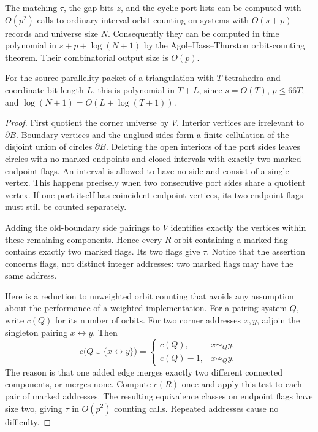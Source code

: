 \begin{theorem}
\label{thm:marked-boundary}
The matching $\tau$, the gap bits $z$, and the cyclic port lists can be
computed with $O(p^2)$ calls to ordinary interval-orbit counting on systems
with $O(s+p)$ records and universe size $N$.  Consequently they can be
computed in time polynomial in $s+p+\log(N+1)$ by the Agol--Hass--Thurston
orbit-counting theorem.  Their combinatorial output size is $O(p)$.

For the source parallelity packet of a triangulation with $T$ tetrahedra
and coordinate bit length $L$, this is polynomial in $T+L$, since
$s=O(T)$, $p\leq66T$, and $\log(N+1)=O(L+\log(T+1))$.
\end{theorem}
\begin{proof}
First quotient the corner universe by $V$.  Interior vertices are
irrelevant to $\partial B$.  Boundary vertices and the unglued sides form
a finite cellulation of the disjoint union of circles $\partial B$.
Deleting the open interiors of the port sides leaves circles with no
marked endpoints and closed intervals with exactly two marked endpoint
flags.  An interval is allowed to have no side and consist of a single
vertex.  This happens precisely when two consecutive port sides share
a quotient vertex.  If one port itself has coincident endpoint vertices,
its two endpoint flags must still be counted separately.

Adding the old-boundary side pairings to $V$ identifies exactly the
vertices within these remaining components.  Hence every $R$-orbit
containing a marked flag contains exactly two marked flags.  Its two flags
give $\tau$.  Notice that the assertion concerns flags, not distinct
integer addresses: two marked flags may have the same address.

Here is a reduction to unweighted orbit counting that avoids any assumption
about the performance of a weighted implementation.  For a pairing system
$Q$, write $c(Q)$ for its number of orbits.  For two corner addresses $x,y$,
adjoin the singleton pairing $x\leftrightarrow y$.  Then
\[
 c\bigl(Q\cup\{x\leftrightarrow y\}\bigr)
 =\begin{cases}
 c(Q),&x\sim_Q y,\\
 c(Q)-1,&x\not\sim_Q y.
 \end{cases}
\]
The reason is that one added edge merges exactly two different connected
components, or merges none.  Compute $c(R)$ once and apply this test to
each pair of marked addresses.  The resulting equivalence classes on
endpoint flags have size two, giving $\tau$ in $O(p^2)$ counting calls.
Repeated addresses cause no difficulty.


\end{proof}
